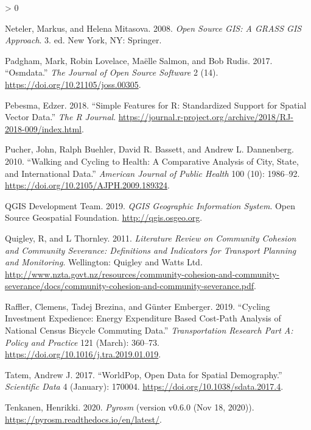 \documentclass[galley]{jtlu-article-2col}
\newlength{\cslhangindent}
\newenvironment{CSLReferences}[2] %
 {%
  \setlength{\parindent}{0pt}
  \ifodd #1 \everypar{\setlength{\hangindent}{\cslhangindent}}\ignorespaces\fi
  \ifnum #2 > 0
  \setlength{\parskip}{#2\baselineskip}
  \fi
 }%
 {}
\begin{document}
\begin{CSLReferences}{1}{0}
\leavevmode\hypertarget{ref-neteler_open_2008}{}%
Neteler, Markus, and Helena Mitasova. 2008. \emph{Open Source {GIS}: A {GRASS GIS} Approach}. 3. ed. {New York, NY}: {Springer}.

\leavevmode\hypertarget{ref-padgham_osmdata_2017}{}%
Padgham, Mark, Robin Lovelace, Maëlle Salmon, and Bob Rudis. 2017. {``Osmdata.''} \emph{The Journal of Open Source Software} 2 (14). \url{https://doi.org/10.21105/joss.00305}.

\leavevmode\hypertarget{ref-pebesma_simple_2018}{}%
Pebesma, Edzer. 2018. {``Simple {Features} for {R}: {Standardized Support} for {Spatial Vector Data}.''} \emph{The R Journal}. \url{https://journal.r-project.org/archive/2018/RJ-2018-009/index.html}.

\leavevmode\hypertarget{ref-pucher_walking_2010}{}%
Pucher, John, Ralph Buehler, David R. Bassett, and Andrew L. Dannenberg. 2010. {``Walking and Cycling to Health: {A} Comparative Analysis of City, State, and International Data.''} \emph{American Journal of Public Health} 100 (10): 1986--92. \url{https://doi.org/10.2105/AJPH.2009.189324}.

\leavevmode\hypertarget{ref-qgisdevelopmentteam_qgis_2019}{}%
QGIS Development Team. 2019. \emph{{QGIS Geographic Information System}}. {Open Source Geospatial Foundation}. \url{http://qgis.osgeo.org}.

\leavevmode\hypertarget{ref-quigley_literature_2011}{}%
Quigley, R, and L Thornley. 2011. \emph{Literature Review on Community Cohesion and Community Severance: {Definitions} and Indicators for Transport Planning and Monitoring}. {Wellington}: {Quigley and Watts Ltd}. \url{http://www.nzta.govt.nz/resources/community-cohesion-and-community-severance/docs/community-cohesion-and-community-severance.pdf}.

\leavevmode\hypertarget{ref-raffler_cycling_2019}{}%
Raffler, Clemens, Tadej Brezina, and Günter Emberger. 2019. {``Cycling Investment Expedience: {Energy} Expenditure Based {Cost}-{Path Analysis} of National Census Bicycle Commuting Data.''} \emph{Transportation Research Part A: Policy and Practice} 121 (March): 360--73. \url{https://doi.org/10.1016/j.tra.2019.01.019}.

\leavevmode\hypertarget{ref-tatem_worldpop_2017}{}%
Tatem, Andrew J. 2017. {``{WorldPop}, Open Data for Spatial Demography.''} \emph{Scientific Data} 4 (January): 170004. \url{https://doi.org/10.1038/sdata.2017.4}.

\leavevmode\hypertarget{ref-tenkanen_pyrosm_2020}{}%
Tenkanen, Henrikki. 2020. \emph{Pyrosm} (version v0.6.0 (Nov 18, 2020)). \url{https://pyrosm.readthedocs.io/en/latest/}.


\end{CSLReferences}
\end{document}
